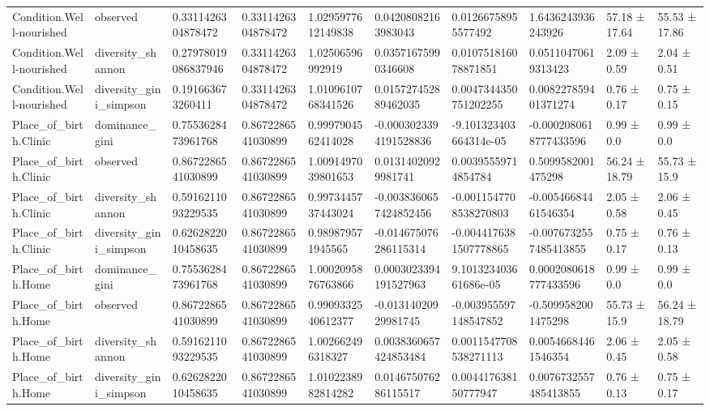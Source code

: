 \begin{longtable}{llllllllll}
Condition.Well-nourished & observed & 0.3311426304878472 & 0.3311426304878472 & 1.0295977612149838 & 0.04208082163983043 & 0.01266758955577492 & 1.6436243936243926 & 57.18 ± 17.64 & 55.53 ± 17.86 \\
Condition.Well-nourished & diversity\_shannon & 0.27978019086837946 & 0.3311426304878472 & 1.02506596992919 & 0.03571675990346608 & 0.010751816078871851 & 0.05110470619313423 & 2.09 ± 0.59 & 2.04 ± 0.51 \\
Condition.Well-nourished & diversity\_gini\_simpson & 0.191663673260411 & 0.3311426304878472 & 1.0109610768341526 & 0.015727452889462035 & 0.0047344350751202255 & 0.008227859401371274 & 0.76 ± 0.17 & 0.75 ± 0.15 \\
Place\_of\_birth.Clinic & dominance\_gini & 0.7553628473961768 & 0.8672286541030899 & 0.9997904562414028 & -0.0003023394191528836 & -9.101323403664314e-05 & -0.0002080618777433596 & 0.99 ± 0.0 & 0.99 ± 0.0 \\
Place\_of\_birth.Clinic & observed & 0.8672286541030899 & 0.8672286541030899 & 1.0091497039801653 & 0.01314020929981741 & 0.00395559714854784 & 0.5099582001475298 & 56.24 ± 18.79 & 55.73 ± 15.9 \\
Place\_of\_birth.Clinic & diversity\_shannon & 0.5916211093229535 & 0.8672286541030899 & 0.9973445737443024 & -0.0038360657424852456 & -0.0011547708538270803 & -0.00546684461546354 & 2.05 ± 0.58 & 2.06 ± 0.45 \\
Place\_of\_birth.Clinic & diversity\_gini\_simpson & 0.6262822010458635 & 0.8672286541030899 & 0.989879571945565 & -0.014675076286115314 & -0.0044176381507778865 & -0.0076732557485413855 & 0.75 ± 0.17 & 0.76 ± 0.13 \\
Place\_of\_birth.Home & dominance\_gini & 0.7553628473961768 & 0.8672286541030899 & 1.0002095876763866 & 0.0003023394191527963 & 9.101323403661686e-05 & 0.0002080618777433596 & 0.99 ± 0.0 & 0.99 ± 0.0 \\
Place\_of\_birth.Home & observed & 0.8672286541030899 & 0.8672286541030899 & 0.9909332540612377 & -0.01314020929981745 & -0.003955597148547852 & -0.5099582001475298 & 55.73 ± 15.9 & 56.24 ± 18.79 \\
Place\_of\_birth.Home & diversity\_shannon & 0.5916211093229535 & 0.8672286541030899 & 1.002662496318327 & 0.0038360657424853484 & 0.0011547708538271113 & 0.00546684461546354 & 2.06 ± 0.45 & 2.05 ± 0.58 \\
Place\_of\_birth.Home & diversity\_gini\_simpson & 0.6262822010458635 & 0.8672286541030899 & 1.0102238982814282 & 0.014675076286115517 & 0.004417638150777947 & 0.0076732557485413855 & 0.76 ± 0.13 & 0.75 ± 0.17 \\

\end{longtable}
